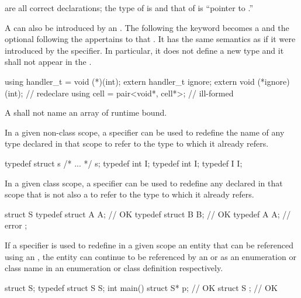 are all correct declarations; the type of  is
 and that of  is ``pointer to .''
\exitexample

\pnum
A  can also be introduced by an
. The  following the
 keyword becomes a 
and the optional  following the
 appertains to that .
It has the same
semantics as if it were introduced by the  specifier. In
particular, it does not define a new type and it shall not appear in the
.
\enterexample

\begin{codeblock}
using handler_t = void (*)(int);
extern handler_t ignore;
extern void (*ignore)(int);         // redeclare 
using cell = pair<void*, cell*>;    // ill-formed
\end{codeblock}

\exitexample

\pnum
A  shall not name an array of runtime bound.

\pnum
{}%
In a given non-class scope, a  specifier can be used to
redefine the name of any type declared in that scope to refer to the
type to which it already refers.
\enterexample

\begin{codeblock}
typedef struct s { /* ... */ } s;
typedef int I;
typedef int I;
typedef I I;
\end{codeblock}
\exitexample

\pnum
In a given class scope, a  specifier can be used to
redefine any  declared in that scope that is not
also a  to refer to the type to which it already
refers.
\enterexample

\begin{codeblock}
struct S {
  typedef struct A { } A;       // OK
  typedef struct B B;           // OK
  typedef A A;                  // error
};
\end{codeblock}
\exitexample

\pnum
If a  specifier is used to redefine in a given scope an
entity that can be referenced using an ,
the entity can continue to be referenced by an
 or as an enumeration or class name
in an enumeration or class definition respectively. \enterexample
\begin{codeblock}
struct S;
typedef struct S S;
int main() {
  struct S* p;                  // OK
}
struct S { };                   // OK
\end{codeblock}
\exitexample

